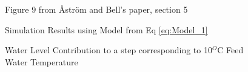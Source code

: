        \begin{figure}[ht]
            \begin{center}
                
                Figure 9 from \r{A}str\"{o}m and Bell's paper, section 5 \cite{Astrom}
                
                
                Simulation Results using Model from Eq \eqref{eq:Model_1}
                
                \caption{Water Level Contribution to a step corresponding to 10$^O$C Feed Water Temperature}
                \label{fig:Fig9B}
            \end{center}
        \end{figure}  %
